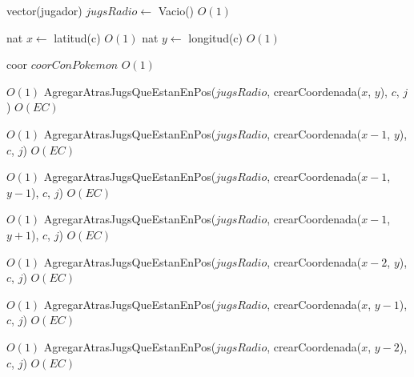\begin{Algoritmos}
\begin{algorithmic}[1]
\State vector(jugador) $jugsRadio \gets$ Vacio() \Comment $O(1)$

\State nat $x \gets$ latitud(c)    \Comment $O(1)$
\State nat $y \gets$ longitud(c)   \Comment $O(1)$

\State coor $coorConPokemon$    \Comment $O(1)$

     \Comment $O(1)$
    \State AgregarAtrasJugsQueEstanEnPos($jugsRadio$, crearCoordenada($x$, $y$), $c$, $j$)    \Comment $O(EC)$
\EndIf

         \Comment $O(1)$
        \State AgregarAtrasJugsQueEstanEnPos($jugsRadio$, crearCoordenada($x-1$, $y$), $c$, $j$)    \Comment $O(EC)$
    \EndIf


             \Comment $O(1)$
            \State AgregarAtrasJugsQueEstanEnPos($jugsRadio$, crearCoordenada($x-1$, $y-1$), $c$, $j$)    \Comment $O(EC)$
        \EndIf

    \EndIf

             \Comment $O(1)$
            \State AgregarAtrasJugsQueEstanEnPos($jugsRadio$, crearCoordenada($x-1$, $y+1$), $c$, $j$)    \Comment $O(EC)$
        \EndIf
    \EndIf

             \Comment $O(1)$
            \State AgregarAtrasJugsQueEstanEnPos($jugsRadio$, crearCoordenada($x-2$, $y$), $c$, $j$)    \Comment $O(EC)$
        \EndIf
    \EndIf

\EndIf


         \Comment $O(1)$
        \State AgregarAtrasJugsQueEstanEnPos($jugsRadio$, crearCoordenada($x$, $y-1$), $c$, $j$)    \Comment $O(EC)$
    \EndIf


             \Comment $O(1)$
            \State AgregarAtrasJugsQueEstanEnPos($jugsRadio$, crearCoordenada($x$, $y-2$), $c$, $j$)    \Comment $O(EC)$
        \EndIf

    \EndIf

\EndIf



\end{algorithmic}
\end{Algoritmos}
